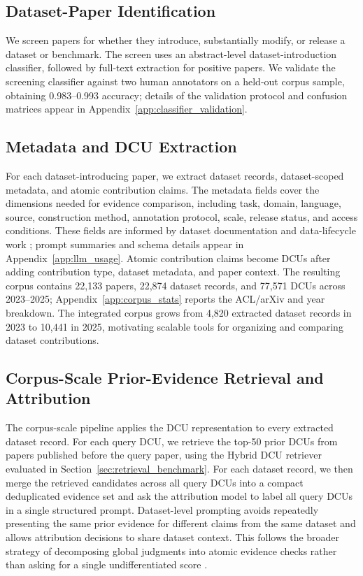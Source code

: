 \documentclass[11pt]{article}
\begin{document}
\subsection{Dataset-Paper Identification}
We screen papers for whether they introduce, substantially modify, or release a dataset or benchmark.
The screen uses an abstract-level dataset-introduction classifier, followed by full-text extraction for positive papers.
We validate the screening classifier against two human annotators on a held-out corpus sample, obtaining 0.983--0.993 accuracy; details of the validation protocol and confusion matrices appear in Appendix~\ref{app:classifier_validation}.
\subsection{Metadata and DCU Extraction}

For each dataset-introducing paper, we extract dataset records, dataset-scoped metadata, and atomic contribution claims.
The metadata fields cover the dimensions needed for evidence comparison, including task, domain, language, source, construction method, annotation protocol, scale, release status, and access conditions.
These fields are informed by dataset documentation and data-lifecycle work \citep{gebru2021datasheets,bender2018data,pushkarna2022data,paullada2021data,holland2018nutrition}; prompt summaries and schema details appear in Appendix~\ref{app:llm_usage}.
Atomic contribution claims become DCUs after adding contribution type, dataset metadata, and paper context.
The resulting corpus contains 22,133 papers, 22,874 dataset records, and 77,571 DCUs across 2023--2025; Appendix~\ref{app:corpus_stats} reports the ACL/arXiv and year breakdown.
The integrated corpus grows from 4,820 extracted dataset records in 2023 to 10,441 in 2025, motivating scalable tools for organizing and comparing dataset contributions.
\subsection{Corpus-Scale Prior-Evidence Retrieval and Attribution}
\label{sec:corpus_attribution}

The corpus-scale pipeline applies the DCU representation to every extracted dataset record.
For each query DCU, we retrieve the top-50 prior DCUs from papers published before the query paper, using the Hybrid DCU retriever evaluated in Section~\ref{sec:retrieval_benchmark}.
For each dataset record, we then merge the retrieved candidates across all query DCUs into a compact deduplicated evidence set and ask the attribution model to label all query DCUs in a single structured prompt.
Dataset-level prompting avoids repeatedly presenting the same prior evidence for different claims from the same dataset and allows attribution decisions to share dataset context.
This follows the broader strategy of decomposing global judgments into atomic evidence checks rather than asking for a single undifferentiated score \citep{min2023factscore,wan2024acueval}.
\end{document}

